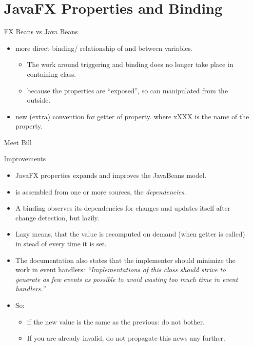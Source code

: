 \section[FX Properties]{JavaFX Properties and Binding}
\begin{frame}{FX Beans vs Java Beans}
  \begin{itemize}
  \item more direct binding/ relationship of and between variables.
    \begin{itemize}
    \item The work around triggering and binding does no longer take
      place in containing class.
    \item because the properties are ``exposed'', so can manipulated from the outside.
    \end{itemize}

  \item new (extra) convention for getter of property. 
    where xXXX is the name of the property.
  \end{itemize}
\end{frame}

\begin{frame}{Meet Bill}
  
\end{frame}

\begin{frame}{Improvements}
  \begin{itemize}
  \item JavaFX properties expands and improves the JavaBeans model.
  \item {} is assembled from one or more sources, the
    \textit{dependencies}.
  \item A binding observes its dependencies for changes and updates itself
    after change detection, but lazily.
  \item Lazy means, that the value is recomputed on demand (when getter
    is called) in stead of every time it is set.
  \item The documentation also states that the implementer should
    minimize the work in event handlers: \textit{\enquote{Implementations of this class should strive to generate as few events as possible to avoid wasting too much time in event handlers.}}
  \item So:
    \begin{itemize}
    \item if the new value is the same as the previous: do not
      bother.
  \item If you are already invalid, do not propagate this news any further.
  \end{itemize}
  
\end{itemize}
\end{frame}

